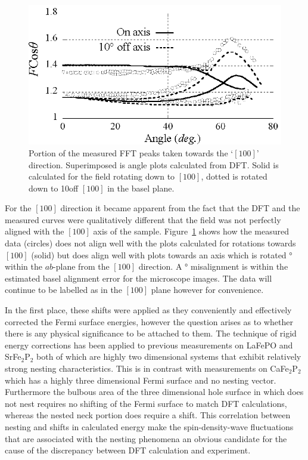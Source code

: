 \begin{figure}[htbp]
    \begin{center}
        \includegraphics[scale=0.9]{Chapter-dHvABaFe2P2/Figures/AngleDepMeasurements/BaselMisalignment/BaselMisalignment}
        \caption{Portion of the measured \ac{FFT} peaks taken towards the `$[100]$' direction. Superimposed is angle plots calculated from \ac{DFT}. Solid is calculated for the field rotating down to $[100]$, dotted is rotated down to 10\degree off $[100]$ in the basel plane.}
        \label{Fig:ResD:BaselMisalignment}
    \end{center}
\end{figure}
For the $[100]$ direction it became apparent from the fact that the \ac{DFT} and the measured curves were qualitatively different that the field was not perfectly aligned with the $[100]$ axis of the sample. Figure~\ref{Fig:ResD:BaselMisalignment} shows how the measured data (circles) does not align well with the plots calculated for rotations towards $[100]$ (solid) but does align well with plots towards an axis which is rotated \unit[10]{\degree} within the $ab$-plane from the $[100]$ direction. A \unit[10]{\degree} misalignment is within the estimated basel alignment error for the microscope images. The data will continue to be labelled as in the $[100]$ plane however for convenience.

In the first place, these shifts were applied as they conveniently and effectively corrected the Fermi surface energies, however the question arises as to whether there is any physical significance to be attached to them. The technique of rigid energy corrections has been applied to previous measurements on LaFePO\cite{Carrington2009} and SrFe$_2$P$_2$\cite{Analytis2009} both of which are highly two dimensional systems that exhibit relatively strong nesting characteristics. This is in contrast with measurements on CaFe$_2$P$_2$\cite{Coldea2009} which has a highly three dimensional Fermi surface and no nesting vector. Furthermore the bulbous area of the three dimensional hole surface in \BaFeP which does not nest requires no shifting of the Fermi surface to match \ac{DFT} calculations, whereas the nested neck portion does require a shift. This correlation between nesting and shifts in calculated energy make the spin-density-wave fluctuations that are associated with the nesting phenomena an obvious candidate for the cause of the discrepancy between \ac{DFT} calculation and experiment.


